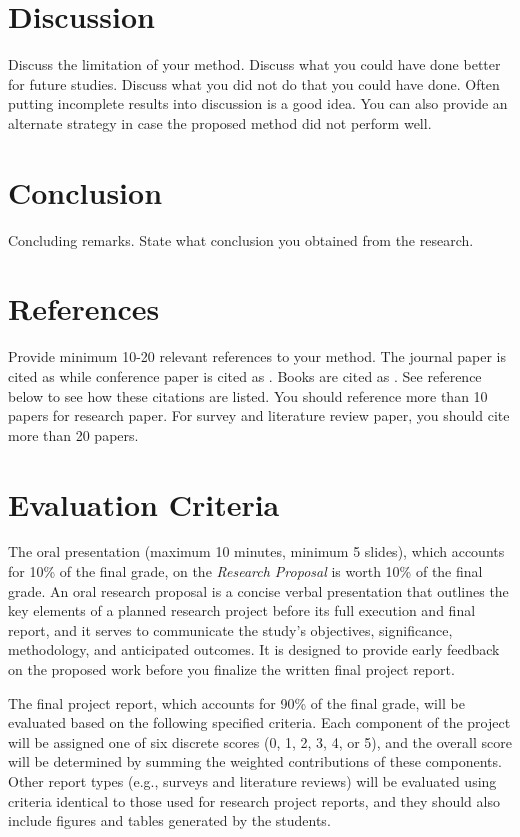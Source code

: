 \documentclass[12pt,portrait]{article}
\begin{document}
\section{Discussion}
Discuss the limitation of your method. Discuss what you could have done better for future studies. Discuss what you did not do that you could have done. Often putting incomplete results into discussion is a good idea. You can also provide   an alternate strategy in case the proposed method did not perform well.


\section{Conclusion}
Concluding remarks. State what conclusion you obtained from the research. 

\section{References}
Provide minimum 10-20 relevant references to your method. The journal paper is cited as \citet{chung.2001.NI} while conference paper is cited as \citet{chung.2003.CVPR}. Books are cited as \citet{chung.2012.CNA}. See reference below to see how these citations are listed. You should reference more than 10 papers for research paper. For survey and literature review paper, you should cite more than 20 papers. 







\newpage 
\section{Evaluation Criteria}


The oral presentation (maximum 10 minutes, minimum 5 slides), which accounts for 10\% of the final grade,  on the {\it Research Proposal} is worth 10\% of the final grade. An oral research proposal is a concise verbal presentation that outlines the key elements of a planned research project before its full execution and final report, and it serves to communicate the study’s objectives, significance, methodology, and anticipated outcomes. It is designed to provide early feedback on the proposed work before you finalize the written final project report. 


The final project report, which accounts for 90\% of the final grade, will be evaluated based on the following specified criteria. Each component of the project will be assigned one of six discrete scores (0, 1, 2, 3, 4, or 5), and the overall score will be determined by summing the weighted contributions of these components. Other report types (e.g., surveys and literature reviews) will be evaluated using criteria  identical to those used for research project reports, and they should also include figures and tables generated by the students. 
\end{document}

